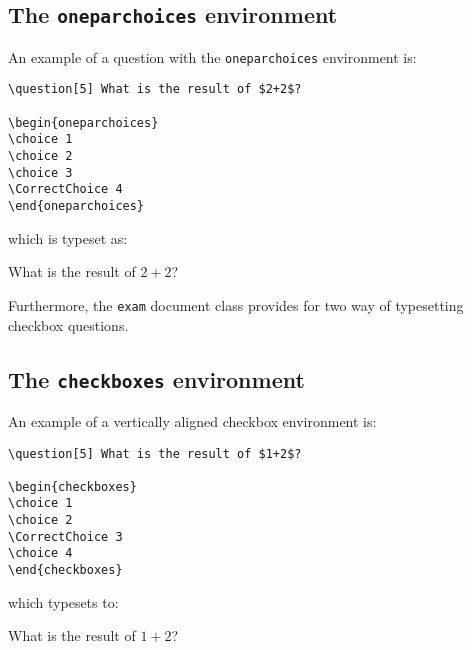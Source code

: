 \documentclass[12pt,a4paper]{exam}
\begin{document}
\subsection{The \texttt{oneparchoices} environment}

An example of a question with the \texttt{oneparchoices} environment is:

\begin{lstlisting}
\question[5] What is the result of $2+2$?

\begin{oneparchoices}
\choice 1
\choice 2
\choice 3
\CorrectChoice 4
\end{oneparchoices}
\end{lstlisting}

which is typeset as:

\begin{questions}
\setcounter{question}{1}
\question[5] What is the result of $2+2$?

\begin{oneparchoices}
\end{oneparchoices}
\end{questions}

Furthermore, the \texttt{exam} document class provides for two way of typesetting
checkbox questions.

\subsection{The \texttt{checkboxes} environment}

An example of a vertically aligned checkbox environment is:

\begin{lstlisting}
\question[5] What is the result of $1+2$?

\begin{checkboxes}
\choice 1
\choice 2
\CorrectChoice 3
\choice 4
\end{checkboxes}
\end{lstlisting}

which typesets to:

\begin{questions}
\setcounter{question}{2}
\question[5] What is the result of $1+2$?

\begin{checkboxes}
\end{checkboxes}
\end{questions}
\end{document}
